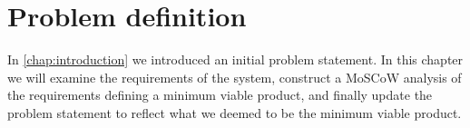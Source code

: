 \chapter{Problem definition}
In \autoref{chap:introduction} we introduced an initial problem statement.
In this chapter we will examine the requirements of the system, construct a MoSCoW analysis of the requirements defining a minimum viable product, and finally update the problem statement to reflect what we deemed to be the minimum viable product.


